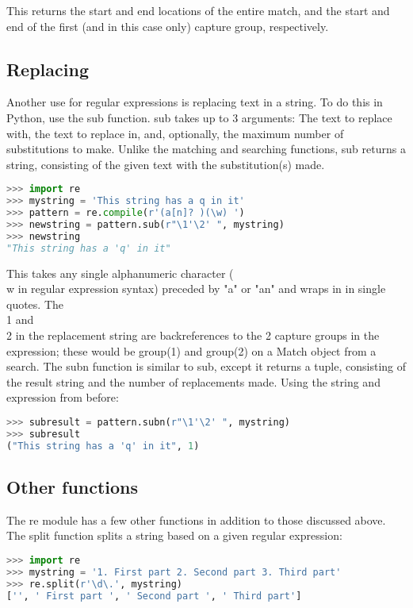 This returns the start and end locations of the entire match, and the start and
end of the first (and in this case only) capture group, respectively.

\subsection{Replacing}
Another use for regular expressions is replacing text in a string. To do this in
Python, use the sub function.  sub takes up to 3 arguments: The text to replace
with, the text to replace in, and, optionally, the maximum number of
substitutions to make. Unlike the matching and searching functions, sub returns
a string, consisting of the given text with the substitution(s) made.
\lstset{basicstyle=\scriptsize, numbers=left, captionpos=b, tabsize=4}
\begin{lstlisting}[caption=Replacing,language={Python},
xleftmargin=15pt, label=lst:replacing]
>>> import re
>>> mystring = 'This string has a q in it'
>>> pattern = re.compile(r'(a[n]? )(\w) ')
>>> newstring = pattern.sub(r"\1'\2' ", mystring)
>>> newstring
"This string has a 'q' in it"
\end{lstlisting}

This takes any single alphanumeric character (\\w in regular expression syntax)
preceded by "a" or "an" and wraps in in single quotes. The \\1 and \\2 in the
replacement string are backreferences to the 2 capture groups in the expression;
these would be group(1) and group(2) on a Match object from a search.  The subn
function is similar to sub, except it returns a tuple, consisting of the result
string and the number of replacements made. Using the string and expression from
before:
\lstset{basicstyle=\scriptsize, numbers=left, captionpos=b, tabsize=4}
\begin{lstlisting}[caption=Replace alphanumeric,language={Python},
xleftmargin=15pt, label=lst:replacealphanumeric]
>>> subresult = pattern.subn(r"\1'\2' ", mystring)
>>> subresult
("This string has a 'q' in it", 1)
\end{lstlisting}

\subsection{Other functions}
The re module has a few other functions in addition to those discussed above.
The split function splits a string based on a given regular expression:
\lstset{basicstyle=\scriptsize, numbers=left, captionpos=b, tabsize=4}
\begin{lstlisting}[caption=Split,language={Python},
xleftmargin=15pt, label=lst:split]
>>> import re
>>> mystring = '1. First part 2. Second part 3. Third part'
>>> re.split(r'\d\.', mystring)
['', ' First part ', ' Second part ', ' Third part']
\end{lstlisting}

